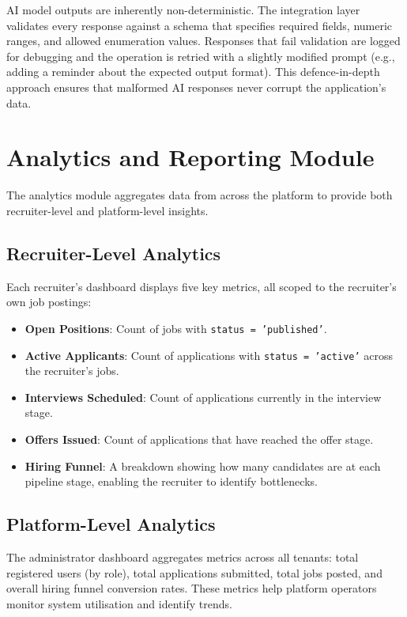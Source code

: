AI model outputs are inherently non-deterministic. The integration layer validates every response against a schema that specifies required fields, numeric ranges, and allowed enumeration values. Responses that fail validation are logged for debugging and the operation is retried with a slightly modified prompt (e.g., adding a reminder about the expected output format). This defence-in-depth approach ensures that malformed AI responses never corrupt the application's data.

\section{Analytics and Reporting Module}
\label{sec:impl-analytics}

The analytics module aggregates data from across the platform to provide both recruiter-level and platform-level insights.

\subsection{Recruiter-Level Analytics}

Each recruiter's dashboard displays five key metrics, all scoped to the recruiter's own job postings:

\begin{itemize}[leftmargin=1.5em]
  \item \textbf{Open Positions}: Count of jobs with \texttt{status = 'published'}.
  \item \textbf{Active Applicants}: Count of applications with \texttt{status = 'active'} across the recruiter's jobs.
  \item \textbf{Interviews Scheduled}: Count of applications currently in the interview stage.
  \item \textbf{Offers Issued}: Count of applications that have reached the offer stage.
  \item \textbf{Hiring Funnel}: A breakdown showing how many candidates are at each pipeline stage, enabling the recruiter to identify bottlenecks.
\end{itemize}

\subsection{Platform-Level Analytics}

The administrator dashboard aggregates metrics across all tenants: total registered users (by role), total applications submitted, total jobs posted, and overall hiring funnel conversion rates. These metrics help platform operators monitor system utilisation and identify trends.

